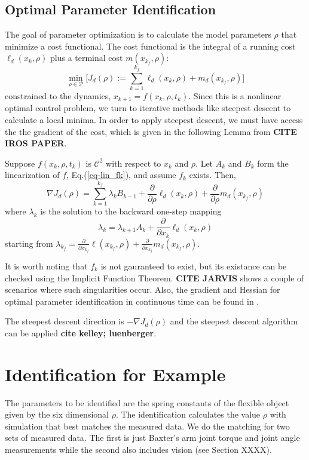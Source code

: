 \documentclass[runningheads,a4paper]{llncs}
\begin{document}
\subsection{Optimal Parameter Identification \label{sec-opt}}
The goal of parameter optimization is to calculate the model parameters $\rho$ that minimize a cost functional.  The cost functional is the integral of a running cost $\ell_d(x_k,\rho)$ plus a terminal cost $m(x_{k_f},\rho)$:
\[
\min_{\rho\in\mathcal{P}} \Big[J_d(\rho):=\sum_{k=1}^{k_f}\ell_d(x_k,\rho) + m_d(x_{k_f},\rho)\Big]
\]
constrained to the dynamics, $x_{k+1} = f(x_k,\rho,t_k)$. Since this is a nonlinear optimal control problem, we turn to iterative methods like steepest descent to calculate a local minima. In order to apply steepest descent, we must have access the the gradient of the cost, which is given in the following Lemma from \textbf{CITE IROS PAPER}. 
\begin{lemma}
\label{lem-grad_a}
Suppose $f(x_k,\rho,t_k)$ is $\mathcal{C}^2$ with respect to $x_k$ and $\rho$.  Let $A_k$ and $B_k$ form the linearization of $f$, Eq.(\ref{eq-lin_fk}), and assume $f_k$ exists.  Then,
\begin{equation}
\nabla J_d(\rho) = \sum_{k = 1}^{k_f}\lambda_kB_{k-1} +\frac{\partial}{\partial \rho}\ell_d(x_k,\rho) + \frac{\partial}{\partial \rho}m_d(x_{k_f},\rho)
\label{eq-DJa}
\end{equation}
where $\lambda_k$ is the solution to the backward one-step mapping
\begin{equation}
\lambda_k = \lambda_{k+1}A_{k} + \frac{\partial}{\partial x_{k}}\ell_d(x_{k},\rho) 
\label{eq-lambda}
\end{equation}
starting from $\lambda_{k_f} = \frac{\partial}{\partial x_{k_f}}\ell(x_{k_f},\rho) + \frac{\partial}{\partial x_{k_f}}m_d(x_{k_f},\rho)$.  
\end{lemma}

It is worth noting that $f_k$ is not gauranteed to exist, but its existance can be checked using the Implicit Function Theorem. \textbf{CITE JARVIS} shows a couple of scenarios where such singularities occur.  Also, the gradient and Hessian for optimal parameter identification in continuous time can be found in \cite{miller_murphey}.

The steepest descent direction is $-\nabla J_d(\rho)$ and the steepest descent algorithm can be applied \textbf{cite kelley; luenberger}.

\section{Identification for Example}
The parameters to be identified are the spring constants of the flexible object given by the six dimensional $\rho$.  The identification calculates the value $\rho$ with simulation that best matches the measured data. We do the matching for two sets of measured data.  The first is just Baxter's arm joint torque and joint angle measurements while the second also includes vision (see Section XXXX).  
\end{document}
